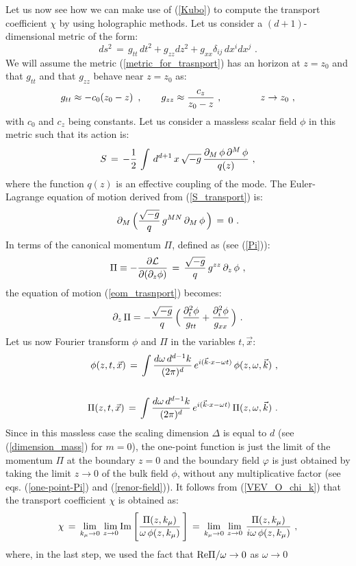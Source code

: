 \documentclass[12pt,notitlepage,a4paper]{article}
\newcommand{\beq}{\begin{equation}}
\newcommand{\eeq}{\end{equation}}
\newcommand{\rc}{\nonumber\\}
\newcommand{\bear}{\begin{eqnarray}}
\newcommand{\eear}{\end{eqnarray}}
\begin{document}
Let us now see how we can make use of (\ref{Kubo}) to compute the transport coefficient $\chi$ by using holographic methods.  Let us consider a $(d+1)$-dimensional metric of the form:
\beq
ds^2\,=\,g_{tt}\,dt^2+g_{zz} dz^2+g_{xx} \delta_{ij}\,dx^i dx^j\,\,.
\label{metric_for_trasnport}
\eeq
We will  assume the metric (\ref{metric_for_trasnport})  has an horizon at $z=z_0$ and that  $g_{tt}$ and that $g_{zz}$ behave near $z=z_0$ as:
\beq
g_{tt}\approx -c_0 (z_0-z)
\,\,\,,
\qquad
g_{zz}\approx {c_z \over z_0-z}\,\,,
\qquad\qquad
z\to z_0\,\,,
\eeq
with $c_0$ and $c_z$ being constants. Let us consider a massless scalar field $\phi$ in this metric such that its action is:
\beq
S\,=\,-{1\over 2}\,\int\,d^{d+1}\,x\,\sqrt{-g}\,{\partial_M\,\phi\,\partial^M\,\phi\over q(z)}\,\,,
\label{S_transport}
\eeq
where the function $q(z)$ is an effective coupling of the mode. The Euler-Lagrange equation of motion  derived from (\ref{S_transport}) is:
\beq
\partial_{M}\,\Big({\sqrt{-g}\over q}\,g^{MN}\,\partial_M\,\phi\,\Big)\,=\,0\,\,.
\label{eom_trasnport}
\eeq
In terms of the canonical  momentum $\Pi$, defined as (see (\ref{Pi})):
\beq
\Pi\equiv- {\partial {\cal L}\over \partial(\partial_z \phi)}\,=\,
{\sqrt{-g}\over q}\,g^{zz}\,\partial_z\,\phi\,\,,
\label{Pi_transport}
\eeq
the equation of motion  (\ref{eom_trasnport}) becomes:
\beq
\partial_z\,\Pi=-{\sqrt{-g}\over q}\,\Big(\,
{\partial_t^{2}\phi\over g_{tt}}+{\partial_i^{2}\phi\over g_{xx}}
\,\Big)\,\,.
\eeq
Let us now Fourier transform $\phi$ and $\Pi$  in the variables $t, \vec x$:
\bear
&&\phi(z,t,\vec x)\,=\,\int {d\omega\, d^{d-1} k\over (2\pi)^d}\,
e^{i(\vec k\cdot x-\omega t)}\, \phi (z,\omega, \vec k)\,\,,
\rc\rc
&&\Pi(z,t,\vec x)\,=\,\int {d\omega\, d^{d-1} k\over (2\pi)^d}\,
e^{i(\vec k\cdot x-\omega t)}\, \Pi (z,\omega, \vec k)\,\,.
\eear
Since in this massless case the scaling dimension $\Delta$ is equal to $d$ (see (\ref{dimension_mass}) for $m=0$), the one-point function is just the limit of the momentum $\Pi$ at the boundary $z=0$ and the boundary field $\varphi$  is just obtained by taking the limit $z\to 0$ of the bulk field $\phi$, without any multiplicative factor (see  eqs. (\ref{one-point-Pi}) and (\ref{renor-field})). It follows from (\ref{VEV_O_chi_k}) that the transport coefficient $\chi$ is obtained as:
\beq
\chi\,=\,\lim_{k_{\mu}\to 0}\,\lim_{z\to 0} {\rm Im}\,
\Bigg[{\Pi(z,k_{\mu})\over \omega\, \phi(z,k_{\mu})}\,\Bigg]\,=\,
\lim_{k_{\mu}\to 0}\,\lim_{z\to 0} \,
{\Pi(z,k_{\mu})\over i \omega\, \phi(z,k_{\mu})}\,\,,
\eeq
where, in the last step, we used the fact that ${\rm Re}\Pi/\omega\to 0$ as $\omega\to 0$
\end{document}
